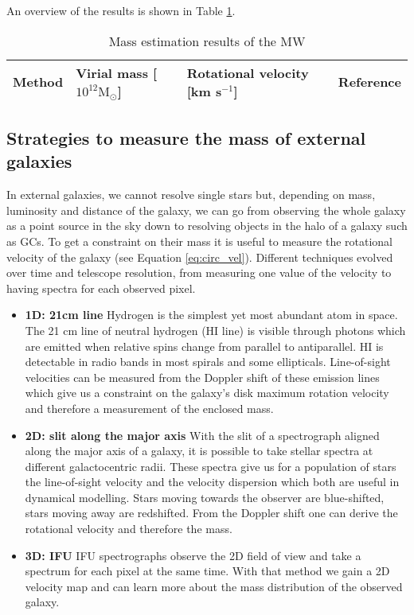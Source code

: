 An overview of the results is shown in Table \ref{tab:MW_mass_estimations}.
\begin{table}[htbp]
\captionsetup{format=plain}
    \centering
    \begin{tabular}{@{}llll@{}}
         \toprule
         Method& Virial mass [$10^{12} \mathrm{M}_\odot$] & Rotational velocity [km s$^{-1}$]&Reference  \\
         
         \midrule

         \bottomrule 
    \end{tabular}
    \caption{Mass estimation results of the \ac{MW} }
    \label{tab:MW_mass_estimations}
\end{table}


\subsection{Strategies to measure the mass of external galaxies}\label{subsec:mass_est_ext}
In external galaxies, we cannot resolve single stars but, depending on mass, luminosity and distance of the galaxy, we can go from observing the whole galaxy as a point source in the sky down to resolving objects in the halo of a galaxy such as \acp{GC}. To get a constraint on their mass it is useful to measure the rotational velocity of the galaxy (see Equation \ref{eq:circ_vel}). Different techniques evolved over time and telescope resolution, from measuring one value of the velocity to having spectra for each observed pixel.
\begin{itemize}
    \item\textbf{1D: 21cm line} Hydrogen is the simplest yet most abundant atom in space. The 21 cm line of neutral hydrogen (HI line) is visible through photons which are emitted when relative spins change from parallel to antiparallel. HI is detectable in radio bands in most spirals and some ellipticals. Line-of-sight velocities can be measured from the Doppler shift of these emission lines which give us a constraint on the galaxy's disk maximum rotation velocity and therefore a measurement of the enclosed mass.
    \item\textbf{2D: slit along the major axis} With the slit of a spectrograph aligned along the major axis of a galaxy, it is possible to take stellar spectra at different galactocentric radii. These spectra give us for a population of stars the line-of-sight velocity and the velocity dispersion which both are useful in dynamical modelling. Stars moving towards the observer are blue-shifted, stars moving away are redshifted. From the Doppler shift one can derive the rotational velocity and therefore the mass. 
    \item \textbf{3D: \acl{IFU}} \ac{IFU} spectrographs observe the 2D field of view and take a spectrum for each pixel at the same time. With that method we gain a 2D velocity map and can learn more about the mass distribution of the observed galaxy.
\end{itemize}

